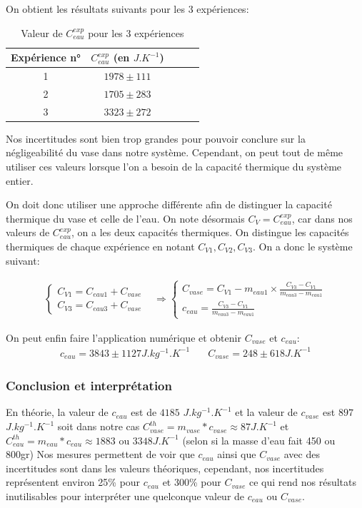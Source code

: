 \documentclass[12pt]{article}
\begin{document}
On obtient les résultats suivants pour les 3 expériences:
\begin{table}[h!]
	\begin{center}
		\begin{tabular}{|c|c|c|c|c|}
			\hline
			Expérience n° & $C_{eau}^{exp}$ (en $J.K^{-1}$) \\ \hline
			1 & $1978 \pm 111$ \\
			2 & $1705 \pm 283$ \\
			3 & $3323 \pm 272$ \\ \hline
		\end{tabular}
	\end{center}
	\caption{Valeur de $C_{eau}^{exp}$ pour les 3 expériences}
\end{table}

Nos incertitudes sont bien trop grandes pour pouvoir conclure sur la négligeabilité du vase dans notre système.
Cependant, on peut tout de même utiliser ces valeurs lorsque l'on a besoin de la capacité thermique du système entier.

On doit donc utiliser une approche différente afin de distinguer la capacité thermique du vase et celle de l'eau. On note désormais $C_V = C_{eau}^{exp}$, car dans nos valeurs de $C_{eau}^{exp}$, 
on a les deux capacités thermiques. On distingue les capacités thermiques de chaque expérience en notant $C_{V1}, C_{V2}, C_{V3}$. On a donc le système suivant:

\begin{align*}
	\begin{cases}
		C_{V1}=C_{eau1}+C_{vase} \\
		C_{V3}=C_{eau3}+C_{vase}
	\end{cases} 
&\Rightarrow 
	\begin{cases}
		C_{vase}= C_{V1} - m_{eau1} \times \frac{C_{V3}-C_{V1}}{m_{eau3} - m_{eau1}} \\
		c_{eau} = \frac{C_{V3}-C_{V1}}{m_{eau3} - m_{eau1}}
	\end{cases}
\end{align*}

On peut enfin faire l'application numérique et obtenir $C_{vase}$ et $c_{eau}$:
\begin{align}
	c_{eau} = 3843 \pm 1127 J.kg^{-1}.K^{-1} & \quad C_{vase} = 248 \pm 618 J.K^{-1}
\end{align}


\subsubsection{Conclusion et interprétation}
En théorie, la valeur de $c_{eau}$ est de $4185$ $J.kg^{-1}.K^{-1}$ et la valeur de $c_{vase}$ est $897$ $J.kg^{-1}.K^{-1}$ soit dans notre cas $C_{vase}^{th} = m_{vase} * c_{vase} \approx 87 J.K^{-1}$ et $C_{eau}^{th} = m_{eau} * c_{eau} \approx 1883 \text{ ou } 3348 J.K^{-1}$ (selon si la masse d'eau fait 450 ou 800gr)
Nos mesures permettent de voir que $c_{eau}$ ainsi que $C_{vase}$ avec des incertitudes sont dans les valeurs théoriques, cependant, nos incertitudes représentent environ 25\% pour $c_{eau}$
et 300\% pour $C_{vase}$ ce qui rend nos résultats inutilisables pour interpréter une quelconque valeur de $c_{eau}$ ou $C_{vase}$. 
\end{document}
